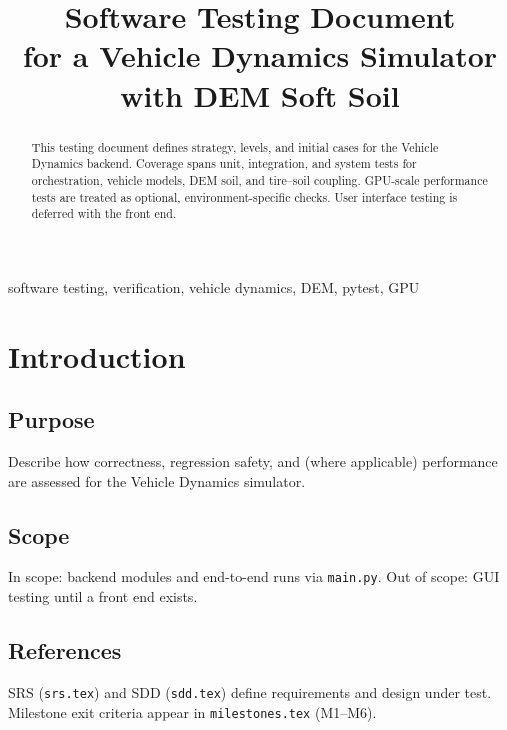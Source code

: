 \documentclass[conference]{IEEEtran}
\begin{document}
\title{Software Testing Document\\for a Vehicle Dynamics Simulator with DEM Soft Soil}

\author{
}

\maketitle

\begin{abstract}
This testing document defines strategy, levels, and initial cases for the
Vehicle Dynamics backend. Coverage spans unit, integration, and system tests for
orchestration, vehicle models, DEM soil, and tire--soil coupling. GPU-scale
performance tests are treated as optional, environment-specific checks. User
interface testing is deferred with the front end.
\end{abstract}

\begin{IEEEkeywords}
software testing, verification, vehicle dynamics, DEM, pytest, GPU
\end{IEEEkeywords}

\section{Introduction}

\subsection{Purpose}
Describe how correctness, regression safety, and (where applicable) performance
are assessed for the Vehicle Dynamics simulator.

\subsection{Scope}
In scope: backend modules and end-to-end runs via \texttt{main.py}. Out of
scope: GUI testing until a front end exists.

\subsection{References}
SRS (\texttt{srs.tex}) and SDD (\texttt{sdd.tex}) define requirements and
design under test. Milestone exit criteria appear in
\texttt{milestones.tex} (M1--M6).
\end{document}

